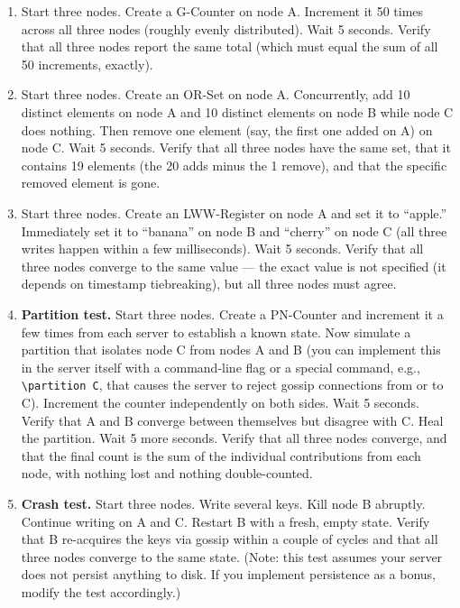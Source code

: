 \documentclass[11pt,a4paper]{article}
\begin{document}
\begin{enumerate}
\item Start three nodes. Create a G-Counter on node A. Increment it 50 times across all three nodes (roughly evenly distributed). Wait 5 seconds. Verify that all three nodes report the same total (which must equal the sum of all 50 increments, exactly).

\item Start three nodes. Create an OR-Set on node A. Concurrently, add 10 distinct elements on node A and 10 distinct elements on node B while node C does nothing. Then remove one element (say, the first one added on A) on node C. Wait 5 seconds. Verify that all three nodes have the same set, that it contains 19 elements (the 20 adds minus the 1 remove), and that the specific removed element is gone.

\item Start three nodes. Create an LWW-Register on node A and set it to ``apple.'' Immediately set it to ``banana'' on node B and ``cherry'' on node C (all three writes happen within a few milliseconds). Wait 5 seconds. Verify that all three nodes converge to the same value --- the exact value is not specified (it depends on timestamp tiebreaking), but all three nodes must agree.

\item \textbf{Partition test.} Start three nodes. Create a PN-Counter and increment it a few times from each server to establish a known state. Now simulate a partition that isolates node C from nodes A and B (you can implement this in the server itself with a command-line flag or a special command, e.g., \verb|\partition C|, that causes the server to reject gossip connections from or to C). Increment the counter independently on both sides. Wait 5 seconds. Verify that A and B converge between themselves but disagree with C. Heal the partition. Wait 5 more seconds. Verify that all three nodes converge, and that the final count is the sum of the individual contributions from each node, with nothing lost and nothing double-counted.

\item \textbf{Crash test.} Start three nodes. Write several keys. Kill node B abruptly. Continue writing on A and C. Restart B with a fresh, empty state. Verify that B re-acquires the keys via gossip within a couple of cycles and that all three nodes converge to the same state. (Note: this test assumes your server does not persist anything to disk. If you implement persistence as a bonus, modify the test accordingly.)
\end{enumerate}
\end{document}
